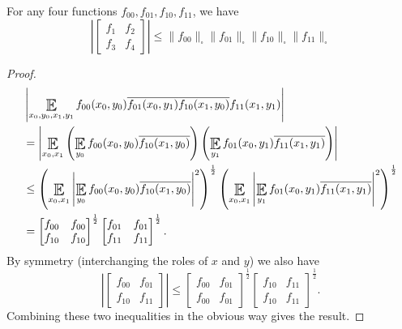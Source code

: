 \documentclass{article}
\DeclareMathOperator*{\E}{\scalerel*{\mathbb{E}}{\textstyle\sum}}
\newcommand{\1}[1]{\mathbbm{1}_{#1}}
\begin{document}
\begin{nlemma}\label{lem:3.1}
  For any four functions $f_{00}, f_{01}, f_{10}, f_{11}$, we have
  \begin{equation*}
    \left|\begin{bmatrix} f_1 & f_2 \\ f_3 & f_4\end{bmatrix}\right| \leq \|f_{00}\|_\square \|f_{01}\|_\square \|f_{10}\|_\square \|f_{11}\|_\square
  \end{equation*}
\end{nlemma}
\begin{proof}
  \begin{align*}
    &\left|\E_{x_0, y_0, x_1, y_1} f_{00}(x_0, y_0) \overline{f_{01}(x_0, y_1)}\overline{f_{10}(x_1, y_0)} f_{11}(x_1, y_1)\right| \\
    &= \left|\E_{x_0,x_1} \left(\E_{y_0} f_{00} (x_0, y_0) \overline{f_{10}(x_1, y_0)}\right)\left(\E_{y_1} f_{01} (x_0, y_1) \overline{f_{11}(x_1, y_1)}\right)\right| \\
    &\leq \left(\E_{x_0,x_1} \left|\E_{y_0} f_{00}(x_0, y_0) \overline{f_{10}(x_1, y_0)}\right|^2\right)^\frac{1}{2} \left(\E_{x_0,x_1} \left|\E_{y_1} f_{01}(x_0, y_1) \overline{f_{11}(x_1, y_1)}\right|^2\right)^\frac{1}{2} \\
    &= \begin{bmatrix}f_{00} & f_{00} \\ f_{10} & f_{10}\end{bmatrix}^\frac{1}{2}\begin{bmatrix}f_{01} & f_{01} \\ f_{11} & f_{11}\end{bmatrix}^\frac{1}{2}.
  \end{align*}
  By symmetry (interchanging the roles of $x$ and $y$) we also have
  \begin{equation*}
    \left|\begin{bmatrix}f_{00} & f_{01} \\ f_{10} & f_{11}\end{bmatrix}\right| \leq
    \begin{bmatrix}f_{00} & f_{01} \\ f_{00} & f_{01}\end{bmatrix}^\frac{1}{2}\begin{bmatrix}f_{10} & f_{11} \\ f_{10} & f_{11}\end{bmatrix}^\frac{1}{2}.
  \end{equation*}
  Combining these two inequalities in the obvious way gives the result.
\end{proof}
\end{document}
